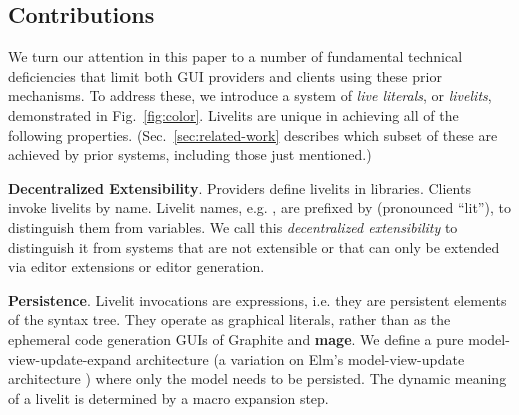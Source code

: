 \subsection{Contributions}
\label{sec:contributions}
We turn our attention in this paper to a number of fundamental technical
deficiencies that limit both GUI providers and clients using these prior mechanisms.
To address these, 
we introduce a system of \emph{live literals}, or \emph{livelits}, 
demonstrated in Fig.~\ref{fig:color}. 
Livelits are unique in achieving all of the following properties.
(Sec.~\ref{sec:related-work} describes which subset of these  
are achieved by prior systems,
including those just mentioned.)

\newcommand{\llproperty}[1]{\vspace{5px}\noindent\textbf{#1}.}

\llproperty{Decentralized Extensibility}
    Providers define livelits in libraries. 
    Clients invoke livelits by name. Livelit names, e.g. , 
    are prefixed by \li{\$} (pronounced ``lit''),    
    to distinguish them from variables.
    We call this \emph{decentralized extensibility}
    to distinguish it from systems that are not extensible or 
    that can only be extended via editor extensions or editor generation.
 
\llproperty{Persistence}
  Livelit invocations are expressions, i.e. they  are persistent elements of the syntax tree. They operate as  
  graphical literals, rather than as the ephemeral code generation GUIs of Graphite and \textbf{mage}. 
  We define a pure model-view-update-expand architecture
  (a variation on Elm's model-view-update architecture \cite{ElmArchitecture}) 
  where only the model needs to be persisted.
  The dynamic meaning of a livelit is determined by a macro expansion step.

